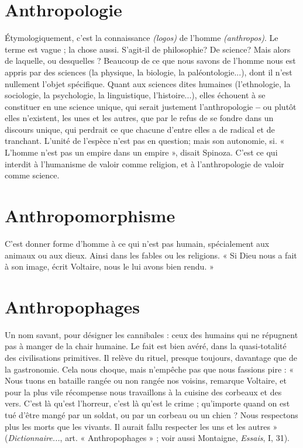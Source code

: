\section{Anthropologie}
Étymologiquement, c’est la connaissance {\it (logos)} de
l’homme {\it (anthropos)}. Le terme est vague ; la chose
aussi. S'agit-il de philosophie? De science? Mais alors de laquelle, ou
desquelles ? Beaucoup de ce que nous savons de l’homme nous est appris par
des sciences (la physique, la biologie, la paléontologie...), dont il n’est nullement
l’objet spécifique. Quant aux sciences dites humaines (l'ethnologie, la
sociologie, la psychologie, la linguistique, l’histoire...), elles échouent à se constituer
en une science unique, qui serait justement l’anthropologie {\bf --} ou plutôt
elles n’existent, les unes et les autres, que par le refus de se fondre dans un discours
unique, qui perdrait ce que chacune d’entre elles a de radical et de tranchant.
L'unité de l'espèce n’est pas en question; mais son autonomie, si.
« L'homme n’est pas un empire dans un empire », disait Spinoza. C’est ce qui
interdit à l’humanisme de valoir comme religion, et à l’anthropologie de valoir
comme science.

\section{Anthropomorphisme}
C’est donner forme d’homme à ce qui n’est pas
humain, spécialement aux animaux ou aux
dieux. Ainsi dans les fables ou les religions. « Si Dieu nous a fait à son image,
écrit Voltaire, nous le lui avons bien rendu. »

\section{Anthropophages}
Un nom savant, pour désigner les cannibales : ceux
des humains qui ne répugnent pas à manger de la
chair humaine. Le fait est bien avéré, dans la quasi-totalité des civilisations primitives.
Il relève du rituel, presque toujours, davantage que de la gastronomie.
Cela nous choque, mais n'empêche pas que nous fassions pire : « Nous tuons
en bataille rangée ou non rangée nos voisins, remarque Voltaire, et pour la plus
vile récompense nous travaillons à la cuisine des corbeaux et des vers. C’est là
qu'est l’horreur, c’est là qu’est le crime ; qu'importe quand on est tué d’être
mangé par un soldat, ou par un corbeau ou un chien ? Nous respectons plus les
morts que les vivants. Il aurait fallu respecter les uns et les autres » ({\it Dictionnaire...},
art. « Anthropophages » ; voir aussi Montaigne, {\it Essais}, I, 31).

